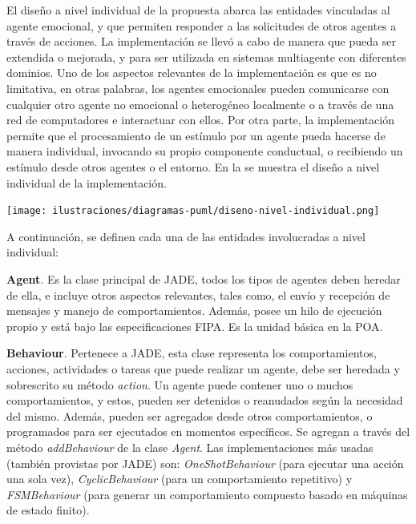
El diseño a nivel individual de la propuesta abarca las entidades
vinculadas al agente emocional, y que permiten responder
a las solicitudes de otros agentes a través de acciones.
La implementación se llevó a cabo de manera que pueda ser extendida o mejorada,
y para ser utilizada en sistemas multiagente con diferentes dominios.
Uno de los aspectos relevantes de la implementación es que es no limitativa,
en otras palabras, los agentes emocionales pueden comunicarse con cualquier otro agente no emocional
o heterogéneo localmente o a través de una red de computadores e interactuar con ellos.
Por otra parte, la implementación permite que el procesamiento de un estímulo por un agente
pueda hacerse de manera individual, invocando su propio componente conductual, o
recibiendo un estímulo desde otros agentes o el entorno.
En la 
se muestra el diseño a nivel individual de la implementación.

\begin{ilustracion}[fuente=\yo, etiqueta=diseno-nivel-individual, titulo={Diseño de la Implementación a Nivel Individual}]
\texttt{[image: ilustraciones/diagramas-puml/diseno-nivel-individual.png]}
\end{ilustracion}

A continuación, se definen cada una de las entidades involucradas a
nivel individual:

\textbf{Agent}. Es la clase principal de JADE, todos los tipos de agentes deben
heredar de ella, e incluye otros aspectos relevantes, tales como, el envío y
recepción de mensajes y manejo de comportamientos. Además, posee un hilo de
ejecución propio y está bajo las especificaciones FIPA. Es la unidad básica en
la POA.

\textbf{Behaviour}. Pertenece a JADE, esta clase representa los
comportamientos, acciones, actividades o tareas que puede realizar un agente, debe
ser heredada y sobrescrito su método \textit{action}. Un agente puede
contener uno o muchos comportamientos, y estos, pueden ser detenidos o
reanudados según la necesidad del mismo. Además, pueden ser agregados desde
otros comportamientos, o programados para ser ejecutados en momentos
específicos. Se agregan a través del método \textit{addBehaviour} de la clase
\textit{Agent}. Las implementaciones más usadas (también provistas por JADE) son:
\textit{OneShotBehaviour} (para ejecutar una acción una sola vez),
\textit{CyclicBehaviour} (para un comportamiento repetitivo) y
\textit{FSMBehaviour} (para generar un comportamiento compuesto basado en
máquinas de estado finito).

